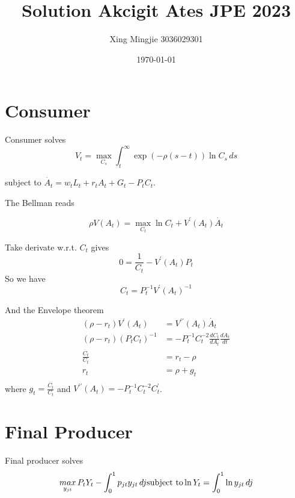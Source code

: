 \documentclass[12pt]{article} %
\title{Solution Akcigit Ates JPE 2023}
\author{Xing Mingjie 3036029301}
\date{\today} %
\begin{document}
\maketitle

\section{Consumer}

Consumer solves 
\[\begin{equation}
	V_t = \mathop{max}\limits_{C_s} \int_t^\infty \exp{(-\rho(s-t))}\ln C_s \, ds
\end{equation}\]

subject to $\dot{A_t} = w_t L_t + r_t A_t + G_t - P_t C_t$.

The Bellman reads 

\[\begin{equation}
	\rho V(A_t) = \mathop{max}\limits_{C_t} \ln C_t + V^\prime(A_{t}) \dot{A_t}
\end{equation}\]

Take derivate w.r.t. $C_t$ gives
\[0 = \frac{1}{C_t} - V^\prime(A_t) P_t\]
So we have 
\[C_t = P_t^{-1}V^\prime (A_t)^{-1}\]

And the Envelope theorem
\[\begin{aligned}
	(\rho-r_t) V^\prime(A_t) &= V^{\prime\prime}(A_t)\dot{A_t}\\
	(\rho-r_t) (P_t C_t)^{-1} &= -P_t^{-1} C_t^{-2} \frac{dC_t}{dA_t} \frac{dA_t}{dt}\\
	\frac{\dot{C_t}}{C_t} & = r_t - \rho\\
	r_t &= \rho + g_t\\
\end{aligned}\]
where $g_t = \frac{\dot{C_t}}{C_t}$ and $V^{\prime\prime}(A_t) = -P_t^{-1}C_t^{-2}C_t^\prime$.

\section{Final Producer}

Final producer solves
\[\begin{equation*}
	\mathop{max}\limits_{y_{jt}} P_t Y_t - \int_0^1 p_{jt} y_{jt} \, dj\\
	\text{subject to} \ln{Y_t} = \int_0^1 \ln y_{jt} \, dj
\end{equation*}\]
\end{document}
